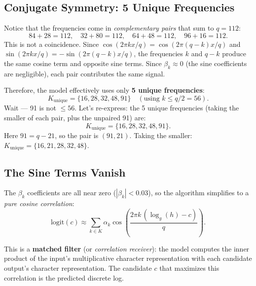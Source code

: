 \documentclass[11pt]{article}
\newcommand{\logg}{\log_g}
\begin{document}
\subsection{Conjugate Symmetry: 5 Unique Frequencies}

Notice that the frequencies come in \emph{complementary pairs} that sum to $q = 112$:
\begin{equation}
    84 + 28 = 112, \quad 32 + 80 = 112, \quad 64 + 48 = 112, \quad 96 + 16 = 112.
\end{equation}
This is not a coincidence. Since $\cos(2\pi k x / q) = \cos(2\pi (q-k) x / q)$ and $\sin(2\pi k x / q) = -\sin(2\pi (q-k) x / q)$, the frequencies $k$ and $q-k$ produce the same cosine term and opposite sine terms. Since $\beta_k \approx 0$ (the sine coefficients are negligible), each pair contributes the same signal.

Therefore, the model effectively uses only \textbf{5 unique frequencies}:
\begin{equation}
    K_{\text{unique}} = \{16, 28, 32, 48, 91\} \quad (\text{using } k \leq q/2 = 56).
\end{equation}
Wait --- 91 is not $\leq 56$. Let's re-express: the 5 unique frequencies (taking the smaller of each pair, plus the unpaired 91) are:
\begin{equation}
    K_{\text{unique}} = \{16, 28, 32, 48, 91\}.
\end{equation}
Here $91 = q - 21$, so the pair is $(91, 21)$. Taking the smaller: $K_{\text{unique}} = \{16, 21, 28, 32, 48\}$.

\subsection{The Sine Terms Vanish}

The $\beta_k$ coefficients are all near zero ($|\beta_k| < 0.03$), so the algorithm simplifies to a \emph{pure cosine correlation}:
\begin{equation}
    \text{logit}(c) \approx \sum_{k \in K} \alpha_k \cos\!\left(\frac{2\pi k \, (\logg(h) - c)}{q}\right).
    \label{eq:simplified_algo}
\end{equation}

This is a \textbf{matched filter} (or \emph{correlation receiver}): the model computes the inner product of the input's multiplicative character representation with each candidate output's character representation. The candidate $c$ that maximizes this correlation is the predicted discrete log.
\end{document}
